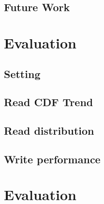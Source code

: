 \documentclass[conference]{IEEEtran}
\begin{document}
\subsection{Future Work}

\section{Evaluation}
\subsection{Setting}
\subsection{Read CDF Trend}
\subsection{Read distribution}
\subsection{Write performance}

\section{Evaluation}
\end{document}
